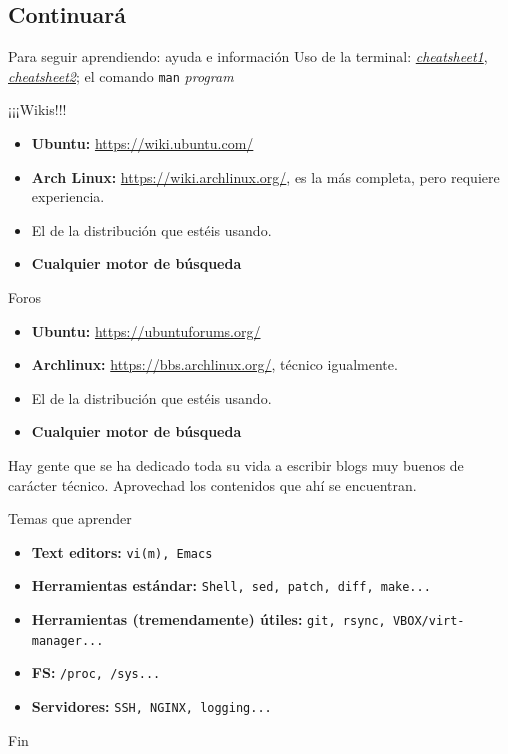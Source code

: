 \documentclass[12pt]{beamer}
\begin{document}
\subsection{Continuará}
\begin{frame}[allowframebreaks]{Para seguir aprendiendo: ayuda e información}
	Uso de la terminal: \href{http://www.cheat-sheets.org/saved-copy/fwunixref.pdf}{\textit{cheatsheet1}}, \href{http://images.linoxide.com/linux-cheat-sheet.pdf}{\textit{cheatsheet2}}; el comando \texttt{man} \textit{program}
	\begin{block}{¡¡¡Wikis!!!}
		\begin{itemize}
			\item \textbf{Ubuntu:} \href{https://wiki.ubuntu.com/}{https://wiki.ubuntu.com/}
			\item \textbf{Arch Linux:} \href{https://wiki.archlinux.org/}{https://wiki.archlinux.org/}, es la más completa, pero requiere experiencia.
			\item El de la distribución que estéis usando.
			\item \textbf{Cualquier motor de búsqueda}
		\end{itemize}
	\end{block}
	\begin{block}{Foros}
		\begin{itemize}
			\item \textbf{Ubuntu:} \href{https://ubuntuforums.org/}{https://ubuntuforums.org/}
			\item \textbf{Archlinux:} \href{https://bbs.archlinux.org/}{https://bbs.archlinux.org/}, técnico igualmente.
			\item El de la distribución que estéis usando.
			\item \textbf{Cualquier motor de búsqueda}
		\end{itemize}
	\end{block}
	Hay gente que se ha dedicado toda su vida a escribir blogs muy buenos de carácter técnico. Aprovechad los contenidos que ahí se encuentran.
\end{frame}

\begin{frame}{Temas que aprender}
	\begin{itemize}
		\item \textbf{Text editors:} \texttt{vi(m), Emacs}
		\item \textbf{Herramientas estándar:} \texttt{Shell, sed, patch, diff, make...}
		\item \textbf{Herramientas (tremendamente) útiles:} \texttt{git, rsync, VBOX/virt-manager...}
		\item \textbf{FS:} \texttt{/proc, /sys...}
		\item \textbf{Servidores:} \texttt{SSH, NGINX, logging...}
	\end{itemize}
\end{frame}

\begin{frame}{Fin}
	
\end{frame}
\end{document}
